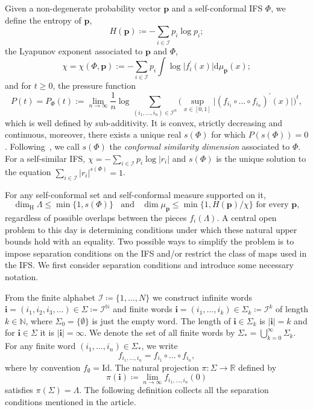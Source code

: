 \documentclass[12pt,]{article}
\theoremstyle{definition}
\theoremstyle{remark}
\renewcommand{\Bbb}[1]{\mathbb{#1}}
\newcommand{\bbN}{{\Bbb N}}         %
\newcommand{\bbR}{{\Bbb R}}        %
\newcommand{\0}{\mathbf{0}}
\newcommand{\bi}{\mathbf{i}}
\begin{document}
{Given a non-degenerate probability vector $\mathbf{p}$ and a self-conformal IFS $\Phi$, we define the entropy of $\mathbf{p}$,
\begin{equation*}
H(\mathbf{p})\coloneqq -\sum_{i\in\mathcal{I}} p_i\log p_i;
\end{equation*}
the Lyapunov exponent associated to $\mathbf{p}$ and $\Phi$,
\begin{equation*}
\chi=\chi(\Phi,\mathbf{p}):=-\sum_{i \in \mathcal{I}} p_i \int \log \big|f_{i}^{'}(x)\big| \mathrm{d} \mu_{\mathbf{p}}(x);
\end{equation*}
and for $t\geq 0$, the pressure function
\begin{equation*}
P(t)=P_{\Phi}(t):=\lim _{n \rightarrow \infty} \frac{1}{n} \log \sum_{(i_1,\ldots,i_n) \in \mathcal{I}^n} \Big(\sup_{x\in[0,1]} \big|(f_{i_1}\circ \dots \circ f_{i_n})^{\prime}(x)\big|\Big)^t,
\end{equation*}
which is well defined by sub-additivity. It is convex, strictly decreasing and continuous, moreover, there exists a unique real $s(\Phi)$ for which $P(s(\Phi))=0$. Following~\cite[Chapter~14]{BaranySimonSolomyak_Book23}, we call $s(\Phi)$ the \emph{conformal similarity dimension} associated to $\Phi$. For a self-similar IFS, $\chi=-\sum_{i \in \mathcal{I}}p_i\log |r_i|$ and $s(\Phi)$ is the unique solution to the equation $\sum_{i \in \mathcal{I}}|r_i|^{s(\Phi)}=1$.

For any self-conformal set and self-conformal measure supported on it, 
\begin{equation}\label{eq:DimUpperBound}
\dim_{\mathrm{H}} \Lambda \leq \min\{1,s(\Phi)\}  \;\;\text{ and }\;\; \dim \mu_{\mathbf{p}} \leq \min\{1, H(\mathbf{p})/\chi\} \text{ for every } \mathbf{p},
\end{equation} 
regardless of possible overlaps between the pieces $f_i(\Lambda)$. A central open problem to this day is determining conditions under which these natural upper bounds hold with an equality. Two possible ways to simplify the problem is to impose separation conditions on the IFS and/or restrict the class of maps used in the IFS. We first consider separation conditions and introduce some necessary notation.


From the finite alphabet $\mathcal{I}\coloneqq\{1,\ldots,N\}$ we construct infinite words $\bi=(i_1,i_2,i_3,\dots) \in\Sigma \coloneqq \mathcal{I}^{\bbN}$ and finite words $\bi=(i_1,\ldots,i_k)\in \Sigma_k\coloneqq \mathcal{I}^k$ of length $k\in\mathbb{N}$, where $\Sigma_0=\{\emptyset\}$ is just the empty word. The length of $\bi\in\Sigma_k$ is $|\bi|=k$ and for $\bi\in\Sigma$ it is $|\bi|=\infty$. We denote the set of all finite words by $\Sigma_* = \bigcup_{k=0}^\infty \Sigma_k$. For any finite word $(i_1,\dots,i_n)\in\Sigma_*$, we write
\[
f_{i_1,\dots,i_n} = f_{i_1}\circ \dots \circ f_{i_n},
\]
where by convention $f_{\emptyset}=\mathrm{Id}$. The natural projection $\pi\colon\Sigma\to\bbR$ defined by
\[
\pi(\bi)\coloneqq\lim_{n\to\infty}f_{i_1,\dots,i_n}(0)
\]
satisfies $\pi(\Sigma)=\Lambda$. The following definition collects all the separation conditions mentioned in the article.

}
\end{document}

